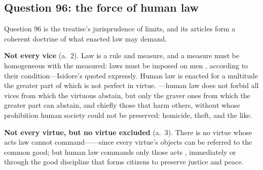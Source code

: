 \subsection{Question 96: the force of human law}

Question 96 is the treatise's jurisprudence of limits, and its articles form a coherent doctrine of what enacted law may demand.

\textbf{Not every vice} (a.~2). Law is a rule and measure, and a measure must be homogeneous with the measured: laws must be imposed on men , according to their condition---Isidore's  quoted expressly. Human law is enacted for a multitude the greater part of which is not perfect in virtue. ---human law does not forbid all vices from which the virtuous abstain, but only the graver ones from which the greater part can abstain, and chiefly those that harm others, without whose prohibition human society could not be preserved: homicide, theft, and the like.

\textbf{Not every virtue, but no virtue excluded} (a.~3). There is no virtue whose acts law cannot command------since every virtue's objects can be referred to the common good; but human law commands only those acts , immediately or through the good discipline that forms citizens to preserve justice and peace.

